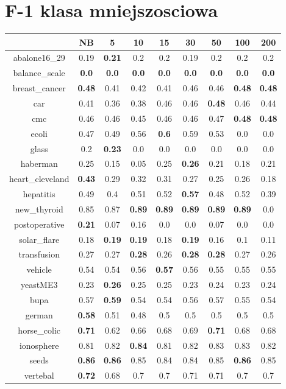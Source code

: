 \documentclass{article}%
\begin{document}
%
\section*{F{-}1 klasa mniejszosciowa}%
\begin{tabular}{c|cccccccc}%
\hline%
&NB&5&10&15&30&50&100&200\\%
\hline%
abalone16\_29&0.19&\textbf{0.21}&0.2&0.2&0.19&0.2&0.2&0.2\\%
\hline%
balance\_scale&\textbf{0.0}&\textbf{0.0}&\textbf{0.0}&\textbf{0.0}&\textbf{0.0}&\textbf{0.0}&\textbf{0.0}&\textbf{0.0}\\%
\hline%
breast\_cancer&\textbf{0.48}&0.41&0.42&0.41&0.46&0.46&\textbf{0.48}&\textbf{0.48}\\%
\hline%
car&0.41&0.36&0.38&0.46&0.46&\textbf{0.48}&0.46&0.44\\%
\hline%
cmc&0.46&0.46&0.45&0.46&0.46&0.47&\textbf{0.48}&\textbf{0.48}\\%
\hline%
ecoli&0.47&0.49&0.56&\textbf{0.6}&0.59&0.53&0.0&0.0\\%
\hline%
glass&0.2&\textbf{0.23}&0.0&0.0&0.0&0.0&0.0&0.0\\%
\hline%
haberman&0.25&0.15&0.05&0.25&\textbf{0.26}&0.21&0.18&0.21\\%
\hline%
heart\_cleveland&\textbf{0.43}&0.29&0.32&0.31&0.27&0.25&0.26&0.18\\%
\hline%
hepatitis&0.49&0.4&0.51&0.52&\textbf{0.57}&0.48&0.52&0.39\\%
\hline%
new\_thyroid&0.85&0.87&\textbf{0.89}&\textbf{0.89}&\textbf{0.89}&\textbf{0.89}&\textbf{0.89}&0.0\\%
\hline%
postoperative&\textbf{0.21}&0.07&0.16&0.0&0.0&0.07&0.0&0.0\\%
\hline%
solar\_flare&0.18&\textbf{0.19}&\textbf{0.19}&0.18&\textbf{0.19}&0.16&0.1&0.11\\%
\hline%
transfusion&0.27&0.27&\textbf{0.28}&0.26&\textbf{0.28}&\textbf{0.28}&0.27&0.26\\%
\hline%
vehicle&0.54&0.54&0.56&\textbf{0.57}&0.56&0.55&0.55&0.55\\%
\hline%
yeastME3&0.23&\textbf{0.26}&0.25&0.25&0.23&0.24&0.23&0.24\\%
\hline%
bupa&0.57&\textbf{0.59}&0.54&0.54&0.56&0.57&0.55&0.54\\%
\hline%
german&\textbf{0.58}&0.51&0.48&0.5&0.5&0.5&0.5&0.5\\%
\hline%
horse\_colic&\textbf{0.71}&0.62&0.66&0.68&0.69&\textbf{0.71}&0.68&0.68\\%
\hline%
ionosphere&0.81&0.82&\textbf{0.84}&0.81&0.82&0.83&0.83&0.82\\%
\hline%
seeds&\textbf{0.86}&\textbf{0.86}&0.85&0.84&0.84&0.85&\textbf{0.86}&0.85\\%
\hline%
vertebal&\textbf{0.72}&0.68&0.7&0.7&0.71&0.71&0.7&0.7\\%
\hline%
\end{tabular}
\end{document}

